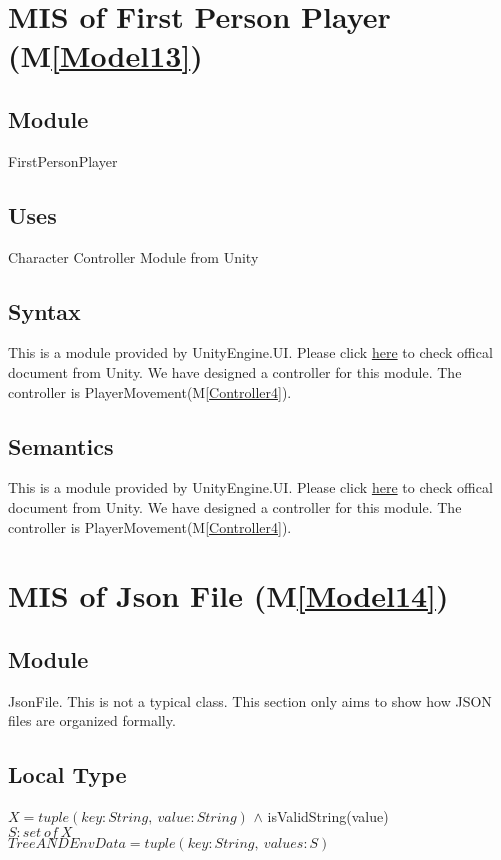 \documentclass[12pt, titlepage]{article}
\newcommand{\mref}[1]{M\ref{#1}}
\begin{document}
\newpage

\section{MIS of First Person Player (\mref{Model13})}

\subsection{Module}
FirstPersonPlayer

\subsection{Uses}
Character Controller Module from Unity

\subsection{Syntax}
This is a module provided by UnityEngine.UI. Please click
\href{https://docs.unity3d.com/ScriptReference/CharacterController.html}{here} to check offical document from Unity. We have 
designed a controller for this module. The controller is 
PlayerMovement(\mref{Controller4}).
\subsection{Semantics}
This is a module provided by UnityEngine.UI. Please click
\href{https://docs.unity3d.com/ScriptReference/CharacterController.html}{here} to check offical document from Unity. We have 
designed a controller for this module. The controller is 
PlayerMovement(\mref{Controller4}).


\newpage

\section{MIS of Json File (\mref{Model14})}

\subsection{Module}
JsonFile. This is not a typical class. This section only aims
to show how JSON files are organized formally.

\subsection{Local Type}
$X = tuple(key:String,\ value:String)$ $\land$ 
isValidString(value) \\
$S : set\ of\ X$\\
$TreeANDEnvData = tuple(key:String,\ values: S)$
\end{document}
